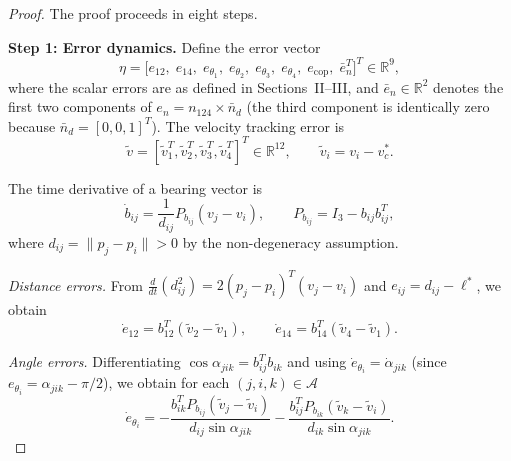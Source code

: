 \begin{proof}
The proof proceeds in eight steps.

\medskip\noindent\textbf{Step 1: Error dynamics.}\quad
Define the error vector
\begin{equation}
\eta=\bigl[e_{12},\;e_{14},\;e_{\theta_1},\;e_{\theta_2},\;e_{\theta_3},\;e_{\theta_4},\;e_{\mathrm{cop}},\;\bar e_n^{T}\bigr]^{T}\in\mathbb R^{9},
\label{eq:eta-def}
\end{equation}
where the scalar errors are as defined in Sections~II--III, and \(\bar e_n\in\mathbb R^2\) denotes the first two components of \(e_n=n_{124}\times\bar n_d\) (the third component is identically zero because \(\bar n_d=[0,0,1]^{T}\)). The velocity tracking error is
\begin{equation}
\tilde v=[\tilde v_1^{T},\tilde v_2^{T},\tilde v_3^{T},\tilde v_4^{T}]^{T}\in\mathbb R^{12},
\qquad\tilde v_i=v_i-v_c^*.
\label{eq:tilde-v-def}
\end{equation}

The time derivative of a bearing vector is
\begin{equation}
\dot b_{ij}=\frac{1}{d_{ij}}P_{b_{ij}}(v_j-v_i),\qquad
P_{b_{ij}}=I_3-b_{ij}b_{ij}^{T},
\label{eq:bdot}
\end{equation}
where \(d_{ij}=\|p_j-p_i\|>0\) by the non-degeneracy assumption.

\emph{Distance errors.} From \(\frac{d}{dt}(d_{ij}^2)=2(p_j-p_i)^{T}(v_j-v_i)\) and \(e_{ij}=d_{ij}-\ell^*\), we obtain
\begin{equation}
\dot e_{12}=b_{12}^{T}(\tilde v_2-\tilde v_1),\qquad
\dot e_{14}=b_{14}^{T}(\tilde v_4-\tilde v_1).
\label{eq:edot-dist}
\end{equation}

\emph{Angle errors.} Differentiating \(\cos\alpha_{jik}=b_{ij}^{T}b_{ik}\) and using \(\dot e_{\theta_i}=\dot\alpha_{jik}\) (since \(e_{\theta_i}=\alpha_{jik}-\pi/2\)), we obtain for each \((j,i,k)\in\mathcal A\)
\begin{equation}
\dot e_{\theta_i}=
-\frac{b_{ik}^{T}P_{b_{ij}}(\tilde v_j-\tilde v_i)}{d_{ij}\sin\alpha_{jik}}
-\frac{b_{ij}^{T}P_{b_{ik}}(\tilde v_k-\tilde v_i)}{d_{ik}\sin\alpha_{jik}}.
\label{eq:alphadot}
\end{equation}


\end{proof}

